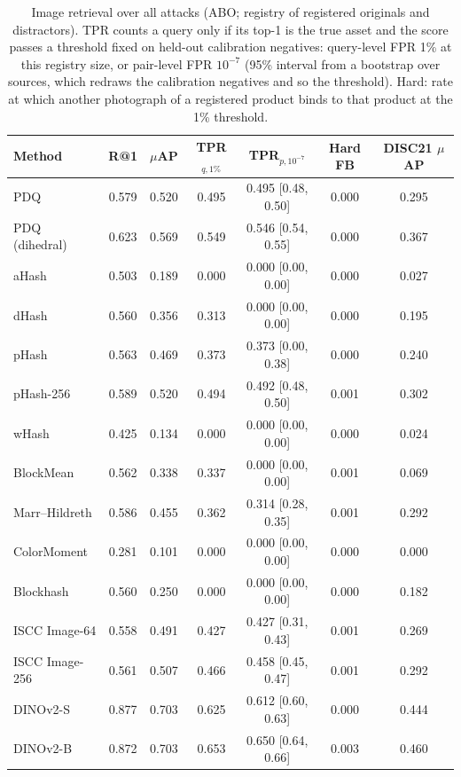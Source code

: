 \begin{table}[!t]
\centering
\footnotesize
\caption{Image retrieval over all attacks (ABO; registry of registered originals and distractors). TPR counts a query only if its top-1 is the true asset and the score passes a threshold fixed on held-out calibration negatives: query-level FPR 1\% at this registry size, or pair-level FPR $10^{-7}$ (95\% interval from a bootstrap over sources, which redraws the calibration negatives and so the threshold). Hard: rate at which another photograph of a registered product binds to that product at the 1\% threshold.}
\label{tab:image}
\setlength{\tabcolsep}{3pt}
\begin{tabular}{lcccccc}
\toprule
Method & R@1 & $\mu$AP & TPR$_{q,1\%}$ & TPR$_{p,10^{-7}}$ & Hard FB & DISC21 $\mu$AP \\
\midrule
PDQ & 0.579 & 0.520 & 0.495 & 0.495 \tiny[0.48, 0.50] & 0.000 & 0.295 \\
PDQ (dihedral) & 0.623 & 0.569 & 0.549 & 0.546 \tiny[0.54, 0.55] & 0.000 & 0.367 \\
aHash & 0.503 & 0.189 & 0.000 & 0.000 \tiny[0.00, 0.00] & 0.000 & 0.027 \\
dHash & 0.560 & 0.356 & 0.313 & 0.000 \tiny[0.00, 0.00] & 0.000 & 0.195 \\
pHash & 0.563 & 0.469 & 0.373 & 0.373 \tiny[0.00, 0.38] & 0.000 & 0.240 \\
pHash-256 & 0.589 & 0.520 & 0.494 & 0.492 \tiny[0.48, 0.50] & 0.001 & 0.302 \\
wHash & 0.425 & 0.134 & 0.000 & 0.000 \tiny[0.00, 0.00] & 0.000 & 0.024 \\
BlockMean & 0.562 & 0.338 & 0.337 & 0.000 \tiny[0.00, 0.00] & 0.001 & 0.069 \\
Marr–Hildreth & 0.586 & 0.455 & 0.362 & 0.314 \tiny[0.28, 0.35] & 0.001 & 0.292 \\
ColorMoment & 0.281 & 0.101 & 0.000 & 0.000 \tiny[0.00, 0.00] & 0.000 & 0.000 \\
Blockhash & 0.560 & 0.250 & 0.000 & 0.000 \tiny[0.00, 0.00] & 0.000 & 0.182 \\
ISCC Image-64 & 0.558 & 0.491 & 0.427 & 0.427 \tiny[0.31, 0.43] & 0.001 & 0.269 \\
ISCC Image-256 & 0.561 & 0.507 & 0.466 & 0.458 \tiny[0.45, 0.47] & 0.001 & 0.292 \\
DINOv2-S & 0.877 & 0.703 & 0.625 & 0.612 \tiny[0.60, 0.63] & 0.000 & 0.444 \\
DINOv2-B & 0.872 & 0.703 & 0.653 & 0.650 \tiny[0.64, 0.66] & 0.003 & 0.460 \\

\end{tabular}
\end{table}
